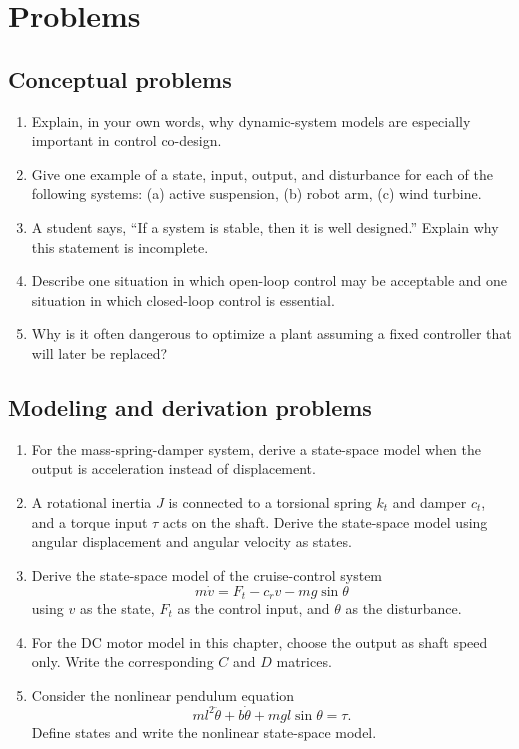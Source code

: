 \documentclass[11pt]{article}
\begin{document}
\section{Problems}

\subsection*{Conceptual problems}
\begin{enumerate}[leftmargin=1.5em,label=\textbf{P\arabic*.}]
  \item Explain, in your own words, why dynamic-system models are especially important in control co-design.
  \item Give one example of a state, input, output, and disturbance for each of the following systems: (a) active suspension, (b) robot arm, (c) wind turbine.
  \item A student says, ``If a system is stable, then it is well designed.'' Explain why this statement is incomplete.
  \item Describe one situation in which open-loop control may be acceptable and one situation in which closed-loop control is essential.
  \item Why is it often dangerous to optimize a plant assuming a fixed controller that will later be replaced?
\end{enumerate}

\subsection*{Modeling and derivation problems}
\begin{enumerate}[leftmargin=1.5em,label=\textbf{P\arabic*.},resume]
  \item For the mass-spring-damper system, derive a state-space model when the output is acceleration instead of displacement.
  \item A rotational inertia $J$ is connected to a torsional spring $k_t$ and damper $c_t$, and a torque input $\tau$ acts on the shaft. Derive the state-space model using angular displacement and angular velocity as states.
  \item Derive the state-space model of the cruise-control system
  \begin{equation*}
  m\dot{v}=F_t-c_r v-mg\sin\theta
  \end{equation*}
  using $v$ as the state, $F_t$ as the control input, and $\theta$ as the disturbance.
  \item For the DC motor model in this chapter, choose the output as shaft speed only. Write the corresponding $C$ and $D$ matrices.
  \item Consider the nonlinear pendulum equation
  \begin{equation*}
  ml^2\ddot{\theta}+b\dot{\theta}+mgl\sin\theta=\tau.
  \end{equation*}
  Define states and write the nonlinear state-space model.
\end{enumerate}
\end{document}
